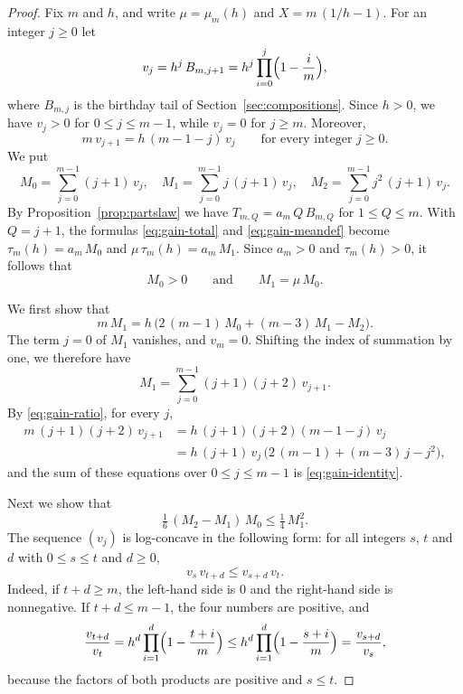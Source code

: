 \documentclass{amsart}
\theoremstyle{definition}
\theoremstyle{remark}
\numberwithin{equation}{section}
\begin{document}
\begin{proof}
Fix $m$ and $h$, and write $\mu=\mu_m(h)$ and $X=m\,(1/h-1)$. For an integer
$j\ge0$ let
\[
v_j=h^{j}\,B_{m,j+1}=h^{j}\prod_{i=0}^{j}\Bigl(1-\frac im\Bigr),
\]
where $B_{m,j}$ is the birthday tail of Section~\ref{sec:compositions}. Since
$h>0$, we have $v_j>0$ for $0\le j\le m-1$, while $v_j=0$ for $j\ge m$.
Moreover,
\begin{equation}\label{eq:gain-ratio}
m\,v_{j+1}=h\,(m-1-j)\,v_j\qquad\text{for every integer }j\ge0.
\end{equation}
We put
\[
M_0=\sum_{j=0}^{m-1}(j+1)\,v_j,\quad
M_1=\sum_{j=0}^{m-1}j\,(j+1)\,v_j,\quad
M_2=\sum_{j=0}^{m-1}j^2\,(j+1)\,v_j.
\]
By Proposition~\ref{prop:partslaw} we have $T_{m,Q}=a_m\,Q\,B_{m,Q}$ for
$1\le Q\le m$. With $Q=j+1$, the formulas \eqref{eq:gain-total} and
\eqref{eq:gain-meandef} become $\tau_m(h)=a_m\,M_0$ and
$\mu\,\tau_m(h)=a_m\,M_1$. Since $a_m>0$ and $\tau_m(h)>0$, it follows that
\begin{equation}\label{eq:gain-moments}
M_0>0\qquad\text{and}\qquad M_1=\mu\,M_0.
\end{equation}

We first show that
\begin{equation}\label{eq:gain-identity}
m\,M_1=h\,\bigl(2\,(m-1)\,M_0+(m-3)\,M_1-M_2\bigr).
\end{equation}
The term $j=0$ of $M_1$ vanishes, and $v_m=0$. Shifting the index of
summation by one, we therefore have
\[
M_1=\sum_{j=0}^{m-1}(j+1)(j+2)\,v_{j+1}.
\]
By \eqref{eq:gain-ratio}, for every $j$,
\begin{align*}
m\,(j+1)(j+2)\,v_{j+1}&=h\,(j+1)(j+2)(m-1-j)\,v_j\\
&=h\,(j+1)\,v_j\,\bigl(2\,(m-1)+(m-3)\,j-j^2\bigr),
\end{align*}
and the sum of these equations over $0\le j\le m-1$ is
\eqref{eq:gain-identity}.

Next we show that
\begin{equation}\label{eq:gain-correlation}
\tfrac16\,(M_2-M_1)\,M_0\le\tfrac14\,M_1^2.
\end{equation}
The sequence $(v_j)$ is log-concave in the following form: for all integers
$s$, $t$ and $d$ with $0\le s\le t$ and $d\ge0$,
\begin{equation}\label{eq:gain-logconcave}
v_s\,v_{t+d}\le v_{s+d}\,v_t.
\end{equation}
Indeed, if $t+d\ge m$, the left-hand side is $0$ and the right-hand side is
nonnegative. If $t+d\le m-1$, the four numbers are positive, and
\[
\frac{v_{t+d}}{v_t}=h^{d}\prod_{i=1}^{d}\Bigl(1-\frac{t+i}{m}\Bigr)
\le h^{d}\prod_{i=1}^{d}\Bigl(1-\frac{s+i}{m}\Bigr)=\frac{v_{s+d}}{v_s},
\]
because the factors of both products are positive and $s\le t$.


\end{proof}
\end{document}
